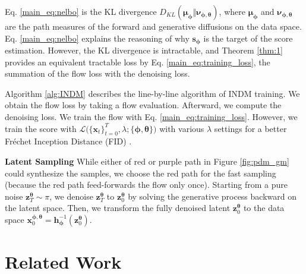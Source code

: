 \documentclass{article}
\theoremstyle{definition}
\theoremstyle{remark}
\begin{document}
	Eq. \eqref{main_eq:nelbo} is the KL divergence $D_{KL}(\bm{\mu}_{\bm{\phi}}\Vert\bm{\nu}_{\bm{\phi},\bm{\theta}})$, where $\bm{\mu}_{\bm{\phi}}$ and $\bm{\nu}_{\bm{\phi},\bm{\theta}}$ are the path measures of the forward and generative diffusions on the data space. Eq. \eqref{main_eq:nelbo} explains the reasoning of why $\mathbf{s}_{\bm{\phi}}$ is the target of the score estimation. However, the KL divergence is intractable, and Theorem \ref{thm:1} provides an equivalent tractable loss by Eq. \eqref{main_eq:training_loss}, the summation of the flow loss with the denoising loss.
	
	Algorithm \ref{alg:INDM} describes the line-by-line algorithm of INDM training. We obtain the flow loss by taking a flow evaluation. Afterward, we compute the denoising loss. We train the flow with Eq. \eqref{main_eq:training_loss}. However, we train the score with $\mathcal{L}\big(\{\mathbf{x}_{t}\}_{t=0}^{T},\lambda;\{\bm{\phi},\bm{\theta}\}\big)$ with various $\lambda$ settings for a better Fr\'echet Inception Distance (FID) \cite{heusel2017gans}.
	
	\textbf{Latent Sampling} While either of red or purple path in Figure \ref{fig:pdm_gm} could synthesize the samples, we choose the red path for the fast sampling (because the red path feed-forwards the flow only once). Starting from a pure noise $\mathbf{z}_{T}^{\bm{\theta}}\sim\pi$, we denoise $\mathbf{z}_{T}^{\bm{\theta}}$ to $\mathbf{z}_{0}^{\bm{\theta}}$ by solving the generative process backward on the latent space. Then, we transform the fully denoised latent $\mathbf{z}_{0}^{\bm{\theta}}$ to the data space $\mathbf{x}_{0}^{\bm{\phi},\bm{\theta}}=\mathbf{h}_{\bm{\phi}}^{-1}(\mathbf{z}_{0}^{\bm{\theta}})$.
	
	\section{Related Work}\label{sec:related_work}
	
\end{document}
